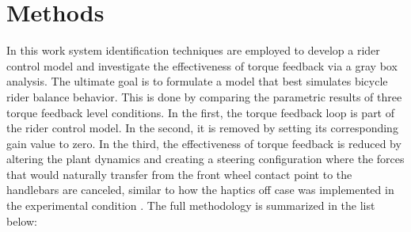 \section{Methods}
  In this work system identification techniques are employed to develop a rider control model and  investigate the effectiveness of torque feedback via a gray box analysis. The ultimate goal is to formulate a model that best simulates bicycle rider balance behavior. This is done by comparing the parametric  results of  three torque feedback level conditions. In the first, the torque feedback loop is part of the rider control model. In the second, it is removed by setting its corresponding gain value to zero. In the third, the effectiveness of torque feedback is reduced by altering the plant dynamics and creating a steering configuration where the forces that would naturally transfer from the front wheel contact point to the handlebars are canceled, similar to how the haptics off case was implemented in the experimental condition \cite{dialynaseffect}. The full methodology is summarized in the list below:
